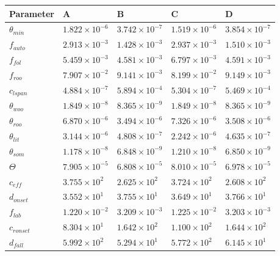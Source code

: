 \documentclass[review]{elsarticle}
\begin{document}
\begin{table}[ht] 
\begin{center}
	\begin{tabular}{| l | l | l | l | l |}
	\hline
	Parameter & A & B & C & D \\ \hline
$\theta_{min}$ & $1.822\times 10^{-6}$ & $3.742\times 10^{-7}$ & $1.519\times 10^{-6}$ & $3.854\times 10^{-7}$ \\ \hline
$f_{auto}$ & $2.913\times 10^{-3}$ & $1.428\times 10^{-3}$ & $2.937\times 10^{-3}$ & $1.510\times 10^{-3}$ \\ \hline
$f_{fol}$ & $5.459\times 10^{-3}$ & $4.581\times 10^{-3}$ & $6.797\times 10^{-3}$ & $4.591\times 10^{-3}$ \\ \hline
$f_{roo}$ & $7.907\times 10^{-2}$ & $9.141\times 10^{-3}$ & $8.199\times 10^{-2}$ & $9.149\times 10^{-3}$ \\ \hline
$c_{lspan}$ & $4.884\times 10^{-7}$ & $5.894\times 10^{-4}$ & $5.304\times 10^{-7}$ & $5.469\times 10^{-4}$ \\ \hline
$\theta_{woo}$ & $1.849\times 10^{-8}$ & $8.365\times 10^{-9}$ & $1.849\times 10^{-8}$ & $8.365\times 10^{-9}$ \\ \hline
$\theta_{roo}$ & $6.870\times 10^{-6}$ & $3.494\times 10^{-6}$ & $7.326\times 10^{-6}$ & $3.508\times 10^{-6}$ \\ \hline
$\theta_{lit}$ & $3.144\times 10^{-6}$ & $4.808\times 10^{-7}$ & $2.242\times 10^{-6}$ & $4.635\times 10^{-7}$ \\ \hline
$\theta_{som}$ & $1.178\times 10^{-8}$ & $6.848\times 10^{-9}$ & $1.210\times 10^{-8}$ & $6.850\times 10^{-9}$ \\ \hline
$\Theta$ & $7.905\times 10^{-5}$ & $6.808\times 10^{-5}$ & $8.010\times 10^{-5}$ & $6.978\times 10^{-5}$ \\ \hline
$c_{eff}$ & $3.755\times 10^{2}$ & $2.625\times 10^{2}$ & $3.724\times 10^{2}$ & $2.608\times 10^{2}$ \\ \hline
$d_{onset}$ & $3.552\times 10^{1}$ & $3.755\times 10^{1}$ & $3.649\times 10^{1}$ & $3.766\times 10^{1}$ \\ \hline
$f_{lab}$ & $1.220\times 10^{-2}$ & $3.209\times 10^{-3}$ & $1.225\times 10^{-2}$ & $3.203\times 10^{-3}$ \\ \hline
$c_{ronset}$ & $8.304\times 10^{1}$ & $1.642\times 10^{2}$ & $1.100\times 10^{2}$ & $1.644\times 10^{2}$ \\ \hline
$d_{fall}$ & $5.992\times 10^{2}$ & $5.294\times 10^{1}$ & $5.772\times 10^{2}$ & $6.145\times 10^{1}$ \\ \hline

\end{tabular}
\end{center}
\end{table}
\end{document}
